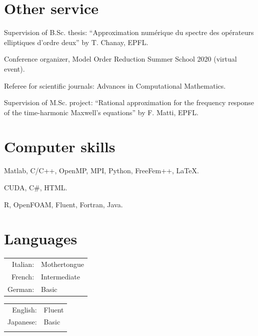 \documentclass[11pt]{article} %
\begin{document}
\section*{Other service}

\hspace{\parindent}Supervision of B.Sc. thesis: ``Approximation num\'erique du spectre des op\'erateurs elliptiques d'ordre deux'' by T. Chanay, EPFL.

Conference organizer, Model Order Reduction Summer School 2020 (virtual event).

\yearsminus Referee for scientific journals: Advances in Computational Mathematics.

Supervision of M.Sc. project: ``Rational approximation for the frequency response of the time-harmonic Maxwell's equations'' by F. Matti, EPFL.

\section*{Computer skills}

\hspace{\parindent}Matlab, C/C++, OpenMP, MPI, Python, FreeFem++, \LaTeX.

CUDA, C\#, HTML.

R, OpenFOAM, Fluent, Fortran, Java.


\section*{Languages}

\begin{minipage}[t]{.45\textwidth}
\begin{tabular}{rl}
Italian: & Mothertongue\\
French: & Intermediate\\
German: & Basic\\
\end{tabular}
\end{minipage}%
\begin{minipage}[t]{.45\textwidth}
\begin{tabular}{rl}
English: & Fluent\\
Japanese: & Basic\\
\\
\end{tabular}
\end{minipage}
\end{document}
